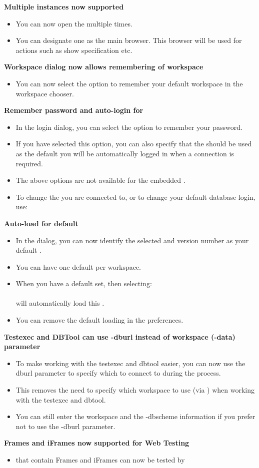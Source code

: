 \textbf{Multiple \gdtestcasebrowser{} instances now supported}
\begin{itemize}
\item You can now open the \gdtestcasebrowser{} multiple times.
\item You can designate one \gdtestcasebrowser{} as the main browser. This browser will be used for actions such as show specification etc.
\end{itemize}

\textbf{Workspace dialog now allows remembering of workspace}
\begin{itemize}
\item You can now select the option to remember your default workspace in the workspace chooser.
\end{itemize}

\textbf{Remember password and auto-login for \gddb{}}
\begin{itemize}
\item In the \gddb{} login dialog, you can select the option to remember your password. 
\item If you have selected this option, you can also specify that the \gddb{} should be used as the default \gddb{} you will be automatically logged in when a \gddb{} connection is required. 
\item The above options are not available for the embedded \gddb{}.
\item To change the \gddb{} you are connected to, or to change your default database login, use:\\
\end{itemize}

\textbf{Auto-load for default \gdproject{}}
\begin{itemize}
\item In the  dialog, you can now identify the selected \gdproject{} and version number as your default \gdproject{}.
\item You can have one default \gdproject{} per workspace. 
\item When you have a default \gdproject{} set, then selecting:\\
\\
will automatically load this \gdproject{}.
\item You can remove the default loading in the  preferences. 
\end{itemize}

\textbf{Testexec and DBTool can use -dburl instead of workspace (-data) parameter}
\begin{itemize}
\item To make working with the testexec and dbtool easier, you can now use the dburl parameter to specify which \gddb{} to connect to during the process.
\item This removes the need to specify which workspace to use (via ) when working with the testexec and dbtool. 
\item You can still enter the workspace and the -dbscheme information if you prefer not to use the -dburl parameter. 
\end{itemize}


\textbf{Frames and iFrames now supported for Web Testing}
\begin{itemize}
\item \gdauts{} that contain Frames and iFrames can now be tested by \app{}
\end{itemize}
